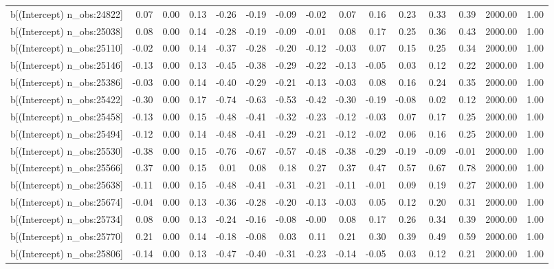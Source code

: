 \begin{table}[ht]
\begin{tabular}{rrrrrrrrrrrrrrr}
  b[(Intercept) n\_obs:24822] & 0.07 & 0.00 & 0.13 & -0.26 & -0.19 & -0.09 & -0.02 & 0.07 & 0.16 & 0.23 & 0.33 & 0.39 & 2000.00 & 1.00 \\ 
  b[(Intercept) n\_obs:25038] & 0.08 & 0.00 & 0.14 & -0.28 & -0.19 & -0.09 & -0.01 & 0.08 & 0.17 & 0.25 & 0.36 & 0.43 & 2000.00 & 1.00 \\ 
  b[(Intercept) n\_obs:25110] & -0.02 & 0.00 & 0.14 & -0.37 & -0.28 & -0.20 & -0.12 & -0.03 & 0.07 & 0.15 & 0.25 & 0.34 & 2000.00 & 1.00 \\ 
  b[(Intercept) n\_obs:25146] & -0.13 & 0.00 & 0.13 & -0.45 & -0.38 & -0.29 & -0.22 & -0.13 & -0.05 & 0.03 & 0.12 & 0.22 & 2000.00 & 1.00 \\ 
  b[(Intercept) n\_obs:25386] & -0.03 & 0.00 & 0.14 & -0.40 & -0.29 & -0.21 & -0.13 & -0.03 & 0.08 & 0.16 & 0.24 & 0.35 & 2000.00 & 1.00 \\ 
  b[(Intercept) n\_obs:25422] & -0.30 & 0.00 & 0.17 & -0.74 & -0.63 & -0.53 & -0.42 & -0.30 & -0.19 & -0.08 & 0.02 & 0.12 & 2000.00 & 1.00 \\ 
  b[(Intercept) n\_obs:25458] & -0.13 & 0.00 & 0.15 & -0.48 & -0.41 & -0.32 & -0.23 & -0.12 & -0.03 & 0.07 & 0.17 & 0.25 & 2000.00 & 1.00 \\ 
  b[(Intercept) n\_obs:25494] & -0.12 & 0.00 & 0.14 & -0.48 & -0.41 & -0.29 & -0.21 & -0.12 & -0.02 & 0.06 & 0.16 & 0.25 & 2000.00 & 1.00 \\ 
  b[(Intercept) n\_obs:25530] & -0.38 & 0.00 & 0.15 & -0.76 & -0.67 & -0.57 & -0.48 & -0.38 & -0.29 & -0.19 & -0.09 & -0.01 & 2000.00 & 1.00 \\ 
  b[(Intercept) n\_obs:25566] & 0.37 & 0.00 & 0.15 & 0.01 & 0.08 & 0.18 & 0.27 & 0.37 & 0.47 & 0.57 & 0.67 & 0.78 & 2000.00 & 1.00 \\ 
  b[(Intercept) n\_obs:25638] & -0.11 & 0.00 & 0.15 & -0.48 & -0.41 & -0.31 & -0.21 & -0.11 & -0.01 & 0.09 & 0.19 & 0.27 & 2000.00 & 1.00 \\ 
  b[(Intercept) n\_obs:25674] & -0.04 & 0.00 & 0.13 & -0.36 & -0.28 & -0.20 & -0.13 & -0.03 & 0.05 & 0.12 & 0.20 & 0.31 & 2000.00 & 1.00 \\ 
  b[(Intercept) n\_obs:25734] & 0.08 & 0.00 & 0.13 & -0.24 & -0.16 & -0.08 & -0.00 & 0.08 & 0.17 & 0.26 & 0.34 & 0.39 & 2000.00 & 1.00 \\ 
  b[(Intercept) n\_obs:25770] & 0.21 & 0.00 & 0.14 & -0.18 & -0.08 & 0.03 & 0.11 & 0.21 & 0.30 & 0.39 & 0.49 & 0.59 & 2000.00 & 1.00 \\ 
  b[(Intercept) n\_obs:25806] & -0.14 & 0.00 & 0.13 & -0.47 & -0.40 & -0.31 & -0.23 & -0.14 & -0.05 & 0.03 & 0.12 & 0.21 & 2000.00 & 1.00 \\ 

\end{tabular}
\end{table}
